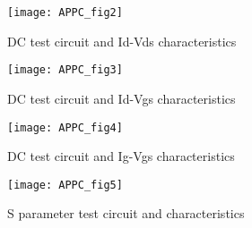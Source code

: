 \newpage
{}

\begin{figure} [h]
  \centering 
  \texttt{[image: APPC\_fig2]}
  \caption{DC test circuit and Id-Vds characteristics}
  \label{fig:APPC_fig2}
\end{figure} 

\begin{figure}
  \centering 
  \texttt{[image: APPC\_fig3]}
  \caption{DC test circuit and Id-Vgs characteristics}
  \label{fig:APPC_fig3}
\end{figure} 


\begin{figure}
  \centering 
  \texttt{[image: APPC\_fig4]}
  \caption{DC test circuit and Ig-Vgs characteristics}
  \label{fig:APPC_fig4}
\end{figure} 

\begin{figure}
  \centering 
  \texttt{[image: APPC\_fig5]}
  \caption{S parameter test circuit and characteristics}
  \label{fig:APPC_fig5}
\end{figure} 



